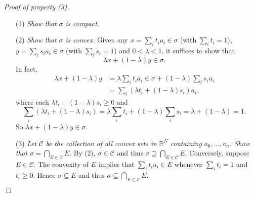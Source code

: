 \documentclass{article}
\begin{document}
\emph{Proof of property (3).}
\begin{enumerate}
\item[(1)]
  \emph{Show that $\sigma$ is compact.}

\item[(2)]
  \emph{Show that $\sigma$ is convex.}
  Given any
  $x = \sum_i t_i a_i \in \sigma$ (with $\sum_i t_i = 1$),
  $y = \sum_i s_i a_i \in \sigma$ (with $\sum_i s_i = 1$) and $0 < \lambda < 1$,
  it suffices to show that
  \[
    \lambda x + (1-\lambda) y \in \sigma.
  \]
  In fact,
  \begin{align*}
    \lambda x + (1-\lambda) y
    &= \lambda \sum_i t_i a_i \in \sigma + (1-\lambda) \sum_i s_i a_i \\
    &= \sum_i (\lambda t_i + (1-\lambda) s_i) a_i,  
  \end{align*}
  where each $\lambda t_i + (1-\lambda) s_i \geq 0$
  and
  \[
    \sum_i (\lambda t_i + (1-\lambda) s_i)
    = \lambda \sum_i t_i + (1-\lambda) \sum_i s_i
    = \lambda + (1-\lambda)
    = 1.
  \]
  So $\lambda x + (1-\lambda) y \in \sigma$.

\item[(3)]
  \emph{Let $\mathscr{C}$ be the collection
  of all convex sets in $\mathbb{R}^N$ containing $a_0, \ldots, a_n$.
  Show that $\sigma = \bigcap_{E \in \mathscr{C}} E$.}
  By (2), $\sigma \in \mathscr{C}$ and thus $\sigma \supseteq \bigcap_{E \in \mathscr{C}} E$.
  Conversely, suppose $E \in \mathscr{C}$.
  The convexity of $E$ implies that
  $\sum_i t_i a_i \in E$ whenever $\sum_i t_i = 1$ and  $t_i \geq 0$.
  Hence $\sigma \subseteq E$ and thus $\sigma \subseteq \bigcap_{E \in \mathscr{C}} E$.
\end{enumerate}
$\Box$ \\\\



\end{document}
